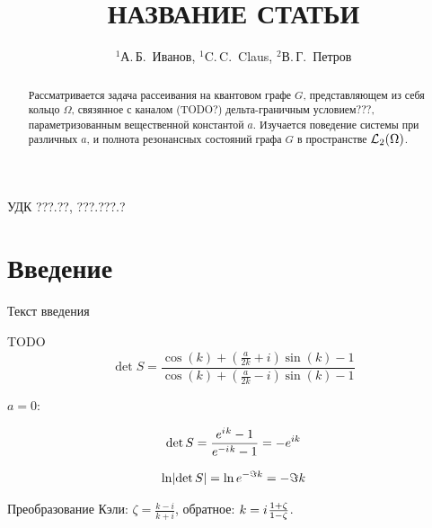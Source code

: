 \documentclass{nsart_eng}
\DeclarePairedDelimiter{\abs}{\lvert}{\rvert}
\newcommand{\eexp}[1]{e^{#1}}
\newcommand{\iu}{{i\mkern1mu}}
\begin{document}
\title[короткое название статьи]
{НАЗВАНИЕ СТАТЬИ}

\author[А.\,Б.~Иванов, C.\,C.~Claus, В.\,Г.~Петров]
{$^1$А.\,Б.~Иванов, $^{1}$C.\,C.~Claus, $^2$В.\,Г.~Петров}

\address{
$^1$ Санкт-Петербургский Национальный Исследовательский Университет Информационных Технологий, \\
Механики и Оптики,\\
Кронверкский пр., 49, Санкт-Петербург, 197101, Россия\\
$^2$ Swiss Federal University of Technology,\\
Sonneggstrasse, 5,  Zurich, CH-8092, Switzerland }


УДК ???.??, ???.???.?%

\begin{abstract}
Рассматривается задача рассеивания на квантовом графе $G$, представляющем из себя кольцо $\Omega$, связянное с каналом (TODO?) дельта-граничным условием???, параметризованным вещественной константой $a$. Изучается поведение системы при различных $a$, и полнота резонансных состояний графа $G$ в пространстве $\mathcal{L}_2(\Omega)$.
\end{abstract}


\maketitle

\section{Введение}

Текст введения

TODO
\[
\det S = 
\frac
{\cos\left(k\right) + {\left(\frac{a}{2 k} + i\right)} \sin\left(k\right) - 1}
{\cos\left(k\right) + {\left(\frac{a}{2 k} - i\right)} \sin\left(k\right) - 1}
\]


$a = 0$:

\[
\det S = \frac{\eexp{\iu k} - 1}{\eexp{-\iu k} - 1} = -\eexp{i k}
\]

\[
\ln \abs{\det S} = \ln \eexp{- \Im k} = -\Im k
\]

Преобразование Кэли: $\zeta = \frac{k - i}{k + i}$, обратное: $k = \iu \frac{1 + \zeta}{1 - \zeta}$.
\end{document}
